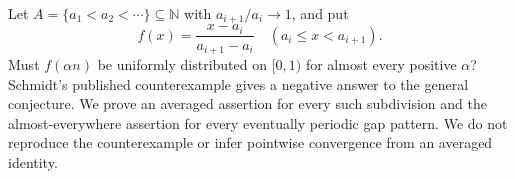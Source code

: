 Let $A=\{a_1<a_2<\cdots\}\subseteq\mathbb N$ with $a_{i+1}/a_i\to1$, and put
\[f(x)=\frac{x-a_i}{a_{i+1}-a_i}\quad(a_i\le x<a_{i+1}).
\]
Must $f(\alpha n)$ be uniformly distributed on $[0,1)$ for almost every positive $\alpha$? Schmidt's published counterexample gives a negative answer to the general conjecture. We prove an averaged assertion for every such subdivision and the almost-everywhere assertion for every eventually periodic gap pattern. We do not reproduce the counterexample or infer pointwise convergence from an averaged identity.
